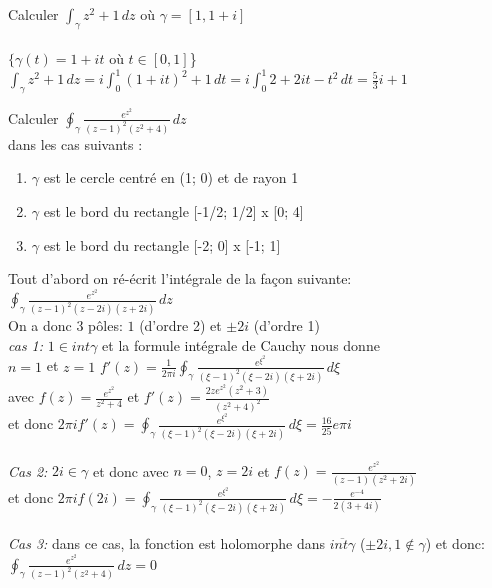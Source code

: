 \begin{myExample}
	Calculer $\int_\gamma z^2+1\,dz$ où $\gamma = [1,1+i]$
	\\
	\\
	$\{\gamma(t)=1 + it$ où $t \in [0,1]$\}
	\\
	$\int_\gamma z^2+1\,dz=i\int_0^1 (1 + it)^2+1\,dt=i\int_0^1 2+2it-t^2\,dt=\frac{5}{3}i+1$
\end{myExample}

\begin{myExample}
	Calculer
	$\oint_\gamma \frac{e^{z^2}}{(z-1)^2(z^2+4)}\,dz$
	\\dans les cas suivants :
	\begin{enumerate}
		\item $\gamma$ est le cercle centré en (1; 0) et de rayon 1
		\item $\gamma$ est le bord du rectangle [-1/2; 1/2] x [0; 4]
		\item $\gamma$ est le bord du rectangle [-2; 0] x [-1; 1]
	\end{enumerate} 

	Tout d'abord on ré-écrit l'intégrale de la façon suivante:
	$\oint_\gamma \frac{e^{z^2}}{(z-1)^2(z-2i)(z+2i)}\,dz$
	\\
	On a donc 3 pôles: $1$ (d'ordre 2) et $\pm 2i$ (d'ordre 1)
	\\{\it cas 1:} $1 \in int \gamma$ et la formule intégrale de Cauchy nous donne
	\\
	$n=1$ et $z=1$
	$f'(z)=\frac{1}{2\pi i}\oint_{\gamma}\frac{e^{\xi^2}}{(\xi-1)^2(\xi-2i)(\xi+2i)}\,d\xi$
	\\avec $f(z)=\frac{e^{z^2}}{z^2+4}$ 
	et $f'(z)=\frac{2ze^{z^2}(z^2+3)}{(z^2+4)^2}$
	\\et donc $2\pi if'(z)=\oint_{\gamma}\frac{e^{\xi^2}}{(\xi-1)^2(\xi-2i)(\xi+2i)}\,d\xi=\frac{16}{25}e\pi i$
	\\\\
	{\it Cas 2:} $2i \in \gamma$ et donc avec $n=0$, $z=2i$ et $f(z)=\frac{e^{z^2}}{(z-1)(z^2+2i)}$ 
	\\et donc $2\pi if(2i)=\oint_{\gamma}\frac{e^{\xi^2}}{(\xi-1)^2(\xi-2i)(\xi+2i)}\,d\xi=-\frac{e^{-4}}{2(3+4i)}$
	\\\\
	{\it Cas 3:} dans ce cas, la fonction est holomorphe dans $\overline{int \gamma}$ ($\pm 2i,1\notin \gamma$) et donc: $\oint_\gamma \frac{e^{z^2}}{(z-1)^2(z^2+4)}\,dz=0$
 
\end{myExample}